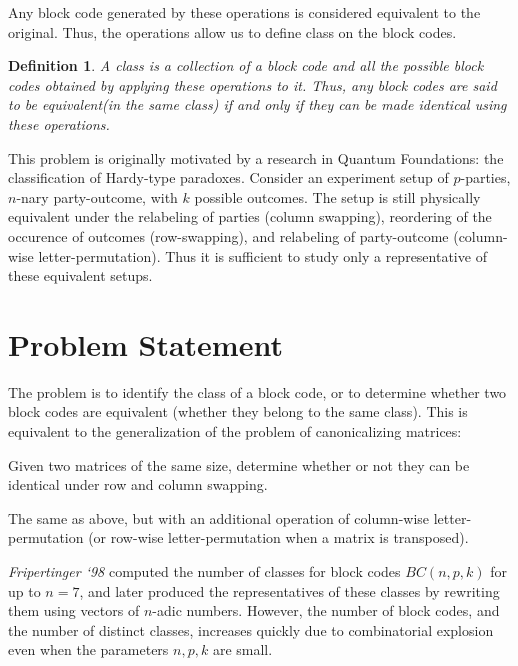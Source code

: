 \documentclass[12pt]{article}  %
\newtheorem{definition}{Definition}
\begin{document}
Any block code generated by these operations is considered equivalent to the original. Thus, the operations allow us to define class on the block codes.


\begin{definition}
A class is a collection of a block code and all the possible block codes obtained by applying these operations to it. Thus, any block codes are said to be equivalent(in the same class) if and only if they can be made identical using these operations.
\end{definition}


 This problem is originally motivated by a research in Quantum Foundations: the classification of Hardy-type paradoxes. Consider an experiment setup of $p$-parties, $n$-nary party-outcome, with $k$ possible outcomes. The setup is still physically equivalent under the relabeling of parties (column swapping), reordering of the occurence of outcomes (row-swapping), and relabeling of party-outcome (column-wise letter-permutation). Thus it is sufficient to study only a representative of these equivalent setups.
















\section{Problem Statement}

The problem is to identify the class of a block code, or to determine whether two block codes are equivalent (whether they belong to the same class). This is equivalent to the generalization of the problem of canonicalizing matrices:

 Given two matrices of the same size, determine whether or not they can be identical under row and column swapping.

 The same as above, but with an additional operation of column-wise letter-permutation (or row-wise letter-permutation when a matrix is transposed).


\textit{Fripertinger `98} computed the number of classes for block codes $BC(n,p,k)$ for up to $n=7$, and later produced the representatives of these classes by rewriting them using vectors of $n$-adic numbers. However, the number of block codes, and the number of distinct classes, increases quickly due to combinatorial explosion even when the parameters $n,p,k$ are small. 
\end{document}
